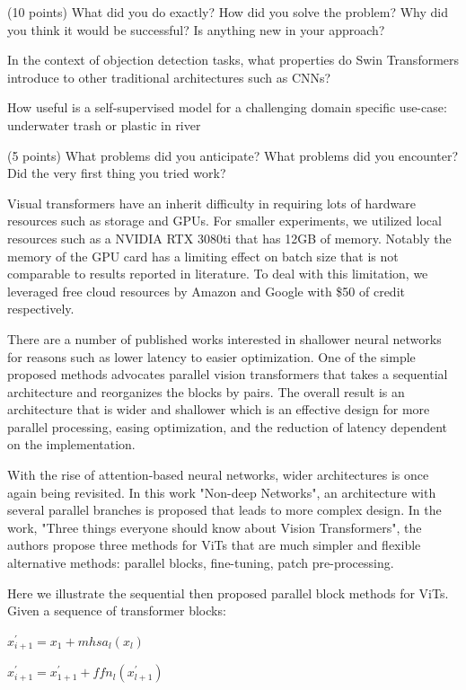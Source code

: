 \documentclass[10pt,twocolumn,letterpaper]{article}
\begin{document}
(10 points) What did you do exactly? How did you solve the problem? Why did you think it would be successful? Is anything new in your approach?

In the context of objection detection tasks, what properties do Swin Transformers introduce to other traditional architectures such as CNNs?


How useful is a self-supervised model for a challenging domain specific use-case: underwater trash or plastic in river

(5 points) What problems did you anticipate? What problems did you encounter? Did the very first thing you tried work?

Visual transformers have an inherit difficulty in requiring lots of hardware resources such as storage and GPUs. For smaller experiments, we utilized local resources such as a NVIDIA RTX 3080ti that has 12GB of memory. Notably the memory of the GPU card has a limiting effect on batch size that is not comparable to results reported in literature. To deal with this limitation, we leveraged free cloud resources by Amazon and Google with \$50 of credit respectively.


There are a number of published works interested in shallower neural networks\cite{goyal2021non}\cite{zagoruyko2016wide} for reasons such as lower latency to easier optimization. One of the simple proposed methods advocates parallel vision transformers\cite{touvron2022three} that takes a sequential architecture and reorganizes the blocks by pairs. The overall result is an architecture that is wider and shallower which is an effective design for more parallel processing, easing optimization, and the reduction of latency dependent on the implementation.

With the rise of attention-based neural networks, wider architectures is once again being revisited\cite{goyal2021non}. In this work "Non-deep Networks", an architecture with several parallel branches is proposed that leads to more complex design. In the work, "Three things everyone should know about Vision Transformers", the authors propose three methods for ViTs that are much simpler and flexible alternative methods: parallel blocks, fine-tuning, patch pre-processing\cite{touvron2022three}.

Here we illustrate the sequential then proposed parallel block methods for ViTs. Given a sequence of transformer blocks:

$x^{'}_{i+1} = x_1 + mhsa_l(x_l)$

$x^{'}_{i+1} = x^{'}_{1+1} + ffn_l(x^{'}_{l+1})$
\end{document}

